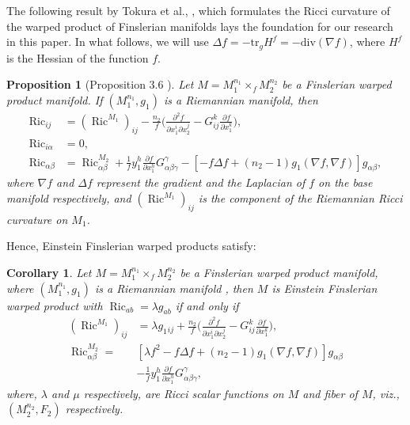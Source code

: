 \documentclass[pdflatex,sn-mathphys-num]{sn-jnl}%
\newtheorem{corollary}{Corollary}[section]
\theoremstyle{thmstyleone}%
\newtheorem{proposition}[theorem]{Proposition}%
\theoremstyle{thmstyletwo}%
\theoremstyle{thmstylethree}%
\begin{document}
 
The following result by Tokura et al., \cite{wlt},
 which formulates the Ricci curvature of the warped product of Finslerian manifolds lays the foundation for our 
 research in this paper.
 In what follows, we will use   $\Delta f= - \mbox{tr}_g H^f=- \mbox{div}(\nabla f)$, where $H^f$ is the Hessian of the function $f$.
 
 \vspace{0.15in}
 
	\begin{proposition}[Proposition 3.6 \textbf{\cite[\boldmath p. $12$]{wlt}}]\label{f101}
		Let $M=M_{1}^{n_1}\times_{f}M_{2}^{n_2}$ be a Finslerian warped product manifold. If $(M_{1}^{n_1},g_1)$ is a Riemannian manifold, then
		\begin{align}
			 \operatorname{Ric}_{ij}&=(\operatorname{Ric}^{M_1})_{ij}-\frac{{n_2}}{f}\bigg(\frac{\partial^{2}f}{\partial x_1^i\partial x_2^j}-G_{ij}^k \frac{\partial f}{\partial x_1^k}\bigg),\label{f2}\\
			\operatorname{Ric}_{i\alpha}&=0,\label{f3}\\
				\operatorname{Ric}_{\alpha \beta}&= \operatorname{Ric}_{\alpha\beta}^{M_2}+\frac{1}{f} y_1^h\frac{\partial f}{\partial x_1^h}G_{\alpha\beta\gamma}^{\gamma}-[- f\Delta f + (n_2 - 1) g_1(\nabla f,\nabla f)]g_{\alpha\beta},\label{f4}
		\end{align}
		where $\nabla f$ and $\Delta f$ represent the gradient and the Laplacian of $f$ on the base manifold respectively, and $(\operatorname{Ric}^{M_1})_{ij}$ is the component of the Riemannian  Ricci curvature on $M_1$.
	\end{proposition}

	


\bigskip

 Hence, Einstein Finslerian warped products satisfy:
 
	
	\begin{corollary}\label{f5} Let $M = M_{1}^{n_1}\times_{f}M_{2}^{n_2}$ be a Finslerian warped product manifold, where $(M_{1}^{n_1},g_1)$ is a Riemannian manifold , then $M$ is Einstein Finslerian warped product with $\operatorname{Ric}_{ab}=\lambda g_{ab}$ if and only if  
		\begin{align}
			(\operatorname{Ric}^{M_1})_{ij}&=\lambda g_1{_{ij}} + \frac{{n_2}}{f}\bigg(\frac{\partial^{2}f}{\partial x_1^i\partial x_2^j}-G_{ij}^k \frac{\partial f}{\partial x_1^k}\bigg),\label{f6}\\
			\operatorname{Ric}_{\alpha\beta}^{M_2}=&[\lambda f^2-f\Delta f + (n_2-1) g_1(\nabla f,\nabla f)]g_{\alpha\beta}\label{f7}\\
			&-\frac{1}{f}y_1^h\frac{\partial f}{\partial x_1^h}G_{\alpha\beta\gamma}^{\gamma},\nonumber
		\end{align}
  where, $\lambda$ and $\mu$ respectively, are Ricci scalar functions on $M$ and fiber of $M$, viz., $(M_2^{n_2}, F_2)$ respectively. 
	\end{corollary}
	
\end{document}
